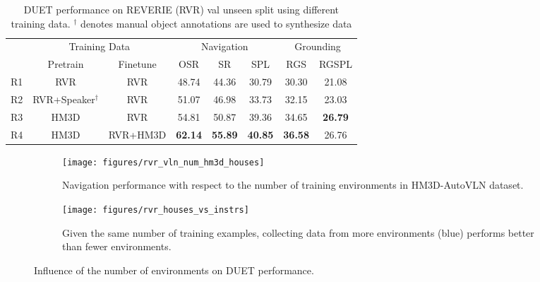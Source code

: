 \begin{table}[t]
\centering
\tabcolsep=0.13cm
\caption{DUET performance on REVERIE (RVR) val unseen split using different training data. $^{\dagger}$ denotes manual object annotations are used to synthesize data}
\label{tab:rvr_instr_vln}
\begin{tabular}{lccccccc} \toprule
\multirow{2}{*}{} & \multicolumn{2}{c}{Training Data} & \multicolumn{3}{c}{Navigation} & \multicolumn{2}{c}{Grounding} \\
 & Pretrain & Finetune & OSR & SR & SPL & RGS & RGSPL \\ \midrule
R1 & RVR & RVR & 48.74 & 44.36 & 30.79 & 30.30 & 21.08 \\
R2 & RVR+Speaker$^{\dagger}$ & RVR & 51.07 & 46.98 & 33.73 & 32.15 & 23.03 \\
R3 & HM3D & RVR & 54.81 & 50.87 & 39.36 & 34.65 & \textbf{26.79} \\
R4 & HM3D & RVR+HM3D & \textbf{62.14} & \textbf{55.89} & \textbf{40.85} & \textbf{36.58} & 26.76 \\ \bottomrule
\end{tabular}
\end{table}

\begin{figure}[t]
    \centering
    \begin{subfigure}[b]{0.48\linewidth}
        \texttt{[image: figures/rvr\_vln\_num\_hm3d\_houses]}
        \caption{Navigation performance with respect to the number of training environments in HM3D-AutoVLN dataset.}
        \label{fig:rvr_vln_num_hm3d_environments}
    \end{subfigure}
    \hfill
    \begin{subfigure}[b]{0.48\linewidth}
        \centering
        \texttt{[image: figures/rvr\_houses\_vs\_instrs]}
        \caption{Given the same number of training examples, collecting data from more environments (blue) performs better than fewer environments.}
        \label{fig:rvr_environments_vs_instrs}
    \end{subfigure}
    \caption{Influence of the number of environments on DUET performance.}
    \label{fig:three graphs}
\end{figure}


